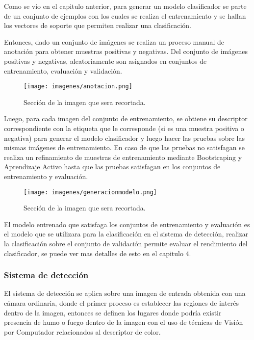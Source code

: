 Como se vio en el capitulo anterior, para generar un modelo clasificador se parte de un conjunto de ejemplos con los cuales se realiza el entrenamiento y se hallan los vectores de soporte que permiten realizar una clasificación.

Entonces, dado un conjunto de imágenes se realiza un proceso manual de anotación para obtener muestras positivas y negativas. Del conjunto de imágenes positivas y negativas, aleatoriamente son asignados en conjuntos de entrenamiento, evaluación y validación.

\begin{figure}[H]
\centering
{\texttt{[image: imagenes/anotacion.png]}}
\caption{Sección de la imagen que sera recortada.}
\label{fig:sectorRecorte}
\end{figure}

Luego, para cada imagen del conjunto de entrenamiento, se obtiene su descriptor correspondiente con la etiqueta que le corresponde (si es una muestra positiva o negativa) para generar el modelo clasificador y luego hacer las pruebas sobre las mismas imágenes de entrenamiento. En caso de que las pruebas no satisfagan se realiza un refinamiento de muestras de entrenamiento mediante Bootstraping y Aprendizaje Activo hasta que las pruebas satisfagan en los conjuntos de entrenamiento y evaluación.

\begin{figure}[H]
\centering
{\texttt{[image: imagenes/generacionmodelo.png]}}
\caption{Sección de la imagen que sera recortada.}
\label{fig:sectorRecorte}
\end{figure}

El modelo entrenado que satisfaga los conjuntos de entrenamiento y evaluación es el modelo que se utilizara para la clasificación en el sistema de detección, realizar la clasificación sobre el conjunto de validación permite evaluar el rendimiento del clasificador, se puede ver mas detalles de esto en el capitulo 4.

\subsubsection{Sistema de detección}

El sistema de detección se aplica sobre una imagen de entrada obtenida con una cámara ordinaria, donde el primer proceso es establecer las regiones de interés dentro de la imagen, entonces se definen los lugares donde podría existir presencia de humo o fuego dentro de la imagen con el uso de técnicas de Visión por Computador relacionados al descriptor de color.

